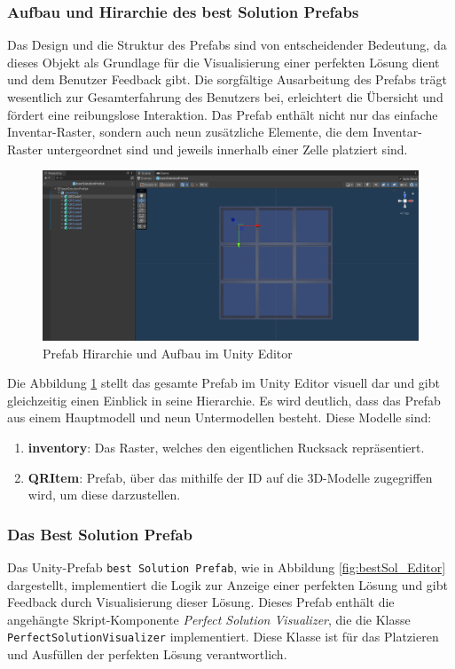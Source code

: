 \subsubsection{Aufbau und Hirarchie des best Solution Prefabs}
Das Design und die Struktur des Prefabs sind von entscheidender Bedeutung, da dieses Objekt als Grundlage für die
Visualisierung einer perfekten Lösung dient und dem Benutzer Feedback gibt. Die sorgfältige Ausarbeitung des Prefabs
trägt wesentlich zur Gesamterfahrung des Benutzers bei, erleichtert die Übersicht und fördert eine reibungslose Interaktion.
Das Prefab enthält nicht nur das einfache Inventar-Raster, sondern auch neun zusätzliche Elemente, die dem Inventar-Raster
untergeordnet sind und jeweils innerhalb einer Zelle platziert sind.
\begin{figure}[H]
    \centering
    \includegraphics[scale=0.3]{images/prefShow}
    \caption{Prefab Hirarchie und Aufbau im Unity Editor}
    \label{fig:InvPref}
\end{figure}
Die Abbildung \ref{fig:InvPref} stellt das gesamte Prefab im Unity Editor visuell dar und gibt gleichzeitig einen Einblick
in seine Hierarchie. Es wird deutlich, dass das Prefab aus einem Hauptmodell und neun Untermodellen besteht. Diese Modelle sind:
\begin{enumerate}
    \item \textbf{inventory}: Das Raster, welches den eigentlichen Rucksack repräsentiert.

    \item \textbf{QRItem}: Prefab, über das mithilfe der ID auf die 3D-Modelle zugegriffen wird, um diese darzustellen.
\end{enumerate}

\subsubsection{Das Best Solution Prefab}
Das Unity-Prefab \texttt{best Solution Prefab}, wie in Abbildung \ref{fig:bestSol_Editor} dargestellt, implementiert die
Logik zur Anzeige einer perfekten Lösung und gibt Feedback durch Visualisierung dieser Lösung. Dieses Prefab enthält die
angehängte Skript-Komponente \textit{Perfect Solution Visualizer}, die die Klasse \texttt{PerfectSolutionVisualizer}
implementiert. Diese Klasse ist für das Platzieren und Ausfüllen der perfekten Lösung verantwortlich.

